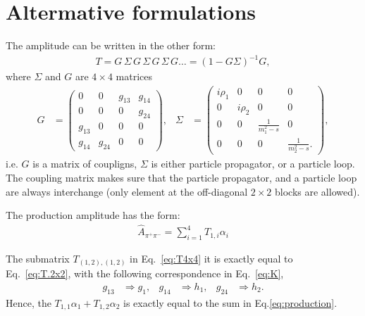 \documentclass[aps,prd,superscriptaddress,onecolumn,nofootinbib,preprintnumbers,notitlepage]{revtex4-1}
\begin{document}
\newpage

\appendix

\section{Altermative formulations}
The amplitude can be written in the other form:
\begin{align} \label{eq:T4x4}
  T = G\,\Sigma\,G\,\Sigma\,G\,\Sigma\,G\dots = (1- G \Sigma)^{-1} G,
\end{align}
where $\Sigma$ and $G$ are $4\times 4$ matrices
\begin{align}
  G &=
  \begin{pmatrix}0 & 0 & g_{13} & g_{14}\\0 & 0 & 0 & g_{24}\\g_{13} & 0 & 0 & 0\\g_{14} & g_{24} & 0 & 0\end{pmatrix},&
  \Sigma &=
  \begin{pmatrix}
    i\rho_1 & 0 & 0 & 0\\
     0 & i\rho_2 & 0 & 0\\
     0 & 0 & \frac{1}{m_1^2-s} & 0\\
     0 & 0 & 0 & \frac{1}{m_2^2-s}.
  \end{pmatrix},
\end{align}
i.e. $G$ is a matrix of coupligns, $\Sigma$ is either particle propagator, or a particle loop.
The coupling matrix makes sure that the particle propagator,
and a particle loop are always interchange (only element at the off-diagonal $2\times 2$ blocks are allowed).

The production amplitude has the form:
\begin{align} \label{eq:A4.production}
  \hat{A}_{\pi^+\pi^-} = \sum_{i=1}^4 T_{1,i} \alpha_i
\end{align}

The submatrix $T_{(1,2),(1,2)}$ in Eq.~\eqref{eq:T4x4} it is exactly equal to Eq.~\eqref{eq:T.2x2},
with the following correspondence in Eq.~\eqref{eq:K},
\begin{align}
  g_{13} &\Rightarrow g_1,&
  g_{14} &\Rightarrow h_1,&
  g_{24} &\Rightarrow h_2.
\end{align}
Hence, the $T_{1,1}\alpha_1 + T_{1,2}\alpha_2$ is exactly equal to the sum in Eq.\eqref{eq:production}.
\end{document}
